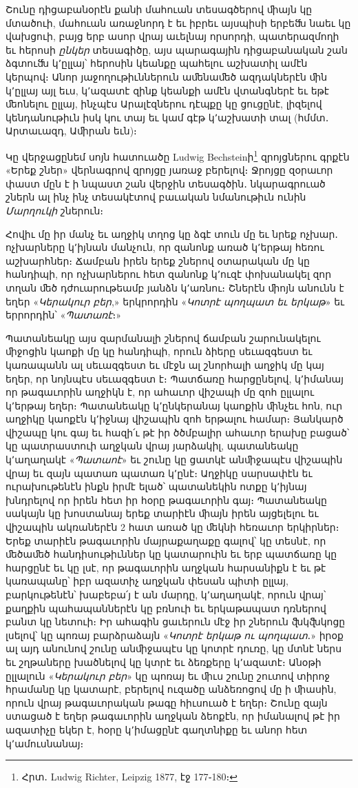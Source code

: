 \documentclass{article}
\begin{document}
{Շունը դիցաբանօրէն քանի մահուան տեսագծերով ﬕայն կը մտածուի, մահուան առաջնորդ է եւ իբրեւ այսպիսի երբեﬓ նաեւ կը վախցուի, բայց երբ ասոր վրայ աւելնայ որսորդի, պատերազմողի եւ հերոսի \emph{ընկեր} տեսագիծը, այս պարագային դիցաբանական շան ձգտուﬓ կ՚ըլլայ՝ հերոսին կեանքը պահելու աշխատիլ ամէն կերպով։ Անոր յաջողութիւններուն աﬔնաﬔծ ազդակներէն ﬕն կ՚ըլլայ այլ եւս, կ՚ազատէ զինք կեանքի ամէն վտանգներէ եւ եթէ ﬔոնելու ըլլայ, ինչպէս Արալէզներու դէպքը կը ցուցընէ, լիզելով կենդանութիւն իսկ կու տայ եւ կամ գէթ կ՚աշխատի տալ (հմմտ․ Արտաւազդ, Աﬕրան եւն)։

Կը վերջացընեմ սոյն հատուածը Ludwig Bechsteinի\footnote{Հրտ․ Ludwig Richter, Leipzig 1877, էջ 177֊180։} զրոյցներու գրքէն «Երեք շներ» վերնագրով զրոյցը յառաջ բերելով։ Ջրոյցը զօրաւոր փաստ մըն է ի նպաստ շան վերջին տեսագծին․ նկարագրուած շներն ալ ինչ ինչ տեսակէտով բաւական նմանութիւն ունին \emph{Մարղուկի} շներուն։

Հովիւ մը իր մանչ եւ աղջիկ տղոց կը ձգէ տուն մը եւ նրեք ոչխար․ ոչխարները կ՚իյնան մանչուն, որ զանոնք առած կ՚երթայ հեռու աշխարհներ։ Ճամբան իրեն երեք շներով օտարական մը կը հանդիպի, որ ոչխարներու հետ զանոնք կ՚ուզէ փոխանակել զոր տղան ﬔծ դժուարութեամբ յանձն կ՚առնու։ Շներէն ﬕոյն անունն է եղեր «\emph{Կերակուր բեր},» երկրորդին «\emph{Կոտրէ պողպատ եւ երկաթ}» եւ երրորդին՝ «\emph{Պատառէ}։»

Պատանեակը այս զարմանալի շներով ճամբան շարունակելու ﬕջոցին կաոքի մը կը հանդիպի, որուն ձիերը սեւազգեստ եւ կառապանն ալ սեւազգեստ եւ մէջն ալ շնորհալի աղջիկ մը կայ եղեր, որ նոյնպէս սեւազգեստ է։ Պատճառը հարցընելով, կ՚իմանայ որ թագաւորին աղջիկն է, որ ահաւոր վիշապի մը զոհ ըլլալու կ՚երթայ եղեր։ Պատանեակը կ՚ընկերանայ կաոքին ﬕնչեւ հոն, ուր աղջիկը կաոքէն կ՚իջնայ վիշապին զոհ երթալու համար։ Յանկարծ վիշապը կու գայ եւ հազի՛ւ թէ իր ծծմբալիր ահաւոր երախը բացած՝ կը պատրաստուի աղջկան վրայ յարձակիլ, պատանեակը կ՚աղաղակէ «\emph{Պատաոէ}» եւ շունը կը ցատկէ անﬕջապէս վիշապին վրայ եւ զայն պատառ պատառ կ՚ընէ։ Աղջիկը սարսափէն եւ ուրախութենէն ինքն իրմէ ելած՝ պատանեկին ոտքը կ՚իյնայ խնդրելով որ իրեն հետ իր հօրը թագաւորին գայ։ Պատանեակը սակայն կը խոստանայ երեք տարիէն ﬕայն իրեն այցելելու եւ վիշապին ակռաներէն 2 հատ առած կը ﬔկնի հեռաւոր երկիրներ։ Երեք տարիէն թագաւորին մայրաքաղաքը գալով՝ կը տեսնէ, որ ﬔծաﬔծ հանդիսութիւններ կը կատարուին եւ երբ պատճառը կը հարցընէ եւ կը լսէ, որ թագաւորին աղջկան հարսանիքն է եւ թէ կառապանը՝ իբր ազատիչ աղջկան փեսան պիտի ըլլայ, բարկութենէն՝ խաբեբա՛յ է ան մարդը, կ՚աղաղակէ, որուն վրայ՝ քաղքին պահապաններէն կը բռնուի եւ երկաթապատ դռներով բանտ կը նետուի։ Իր ահագին ցաւերուն մէջ իր շներուն ﬖկﬖկոցը լսելով՝ կը պոռայ բարձրաձայն «\emph{Կոտրէ երկաթ ու պողպատ}․» իրօք ալ այդ անունով շունը անﬕջապէս կը կոտրէ դուռը, կը մտնէ ներս եւ շղթաները խածնելով կը կտրէ եւ ձեռքերը կ՚ազատէ։ Անօթի ըլլալուն «\emph{Կերակուր բեր}» կը պոռայ եւ ﬕւս շունը շուտով տիրոջ հրամանը կը կատարէ, բերելով ուզածը անձեռոցով մը ի ﬕասին, որուն վրայ թագաւորական թագը հիւսուած է եղեր։ Շունը զայն ստացած է եղեր թագաւորին աղջկան ձեոքէն, որ իմանալով թէ իր ազատիչը եկեր է, հօրը կ՚իմացընէ գաղտնիքը եւ անոր հետ կ՚ամուսնանայ։

}
\end{document}

